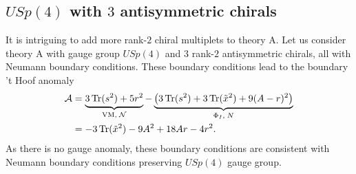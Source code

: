 \documentclass[12pt]{article}
\newcommand{\Acal}{\mathcal{A}}
\newcommand{\Ncal}{\mathcal{N}}
\DeclareMathOperator*{\Tr}{{\rm Tr}}
\numberwithin{equation}{section}
\begin{document}
\subsection{$USp(4)$ with $3$ antisymmetric chirals}
\label{sec_GNR_USp4_3AS_integral}
It is intriguing to add more rank-$2$ chiral multiplets to theory A. 
Let us consider theory A with gauge group $USp(4)$ and $3$ rank-$2$ antisymmetric chirals, all with Neumann boundary conditions. 
These boundary conditions lead to the boundary 't Hoof anomaly
\begin{align}
\label{bdy_USp4_3AS_anomA}
\Acal&= \underbrace{3\Tr(s^2) + 5r^2}_{\textrm{VM}, \; \Ncal}
- \underbrace{\left( 3\Tr(s^2) + 3\Tr(\tilde{x}^2) + 9(A-r)^2 \right)}_{\Phi_I, \; N}
\nonumber\\
&=- 3\Tr(\tilde{x}^2) - 9A^2 + 18Ar - 4r^2. 
\end{align}
As there is no gauge anomaly, these boundary conditions are consistent with Neumann boundary conditions preserving $USp(4)$ gauge group. 
\end{document}
